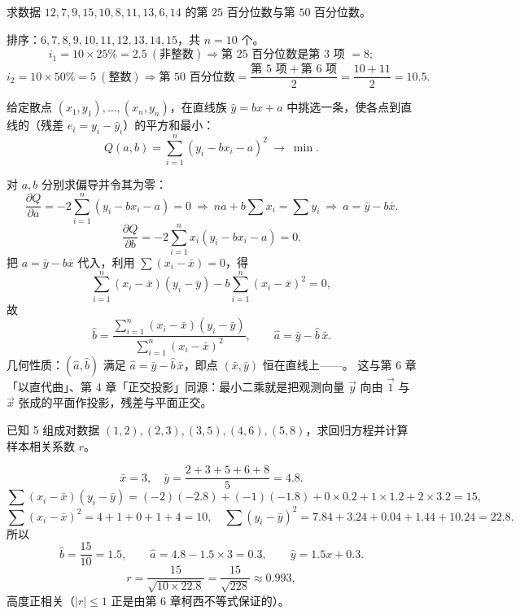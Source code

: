 \begin{explore}
\begin{example}
求数据 $12,7,9,15,10,8,11,13,6,14$ 的第 $25$ 百分位数与第 $50$ 百分位数。
\end{example}
\begin{solution}
排序：$6,7,8,9,10,11,12,13,14,15$，共 $n=10$ 个。
\[
  i_1=10\times25\%=2.5\ (\text{非整数})\Rightarrow \text{第 }25\text{ 百分位数是第 }3\text{ 项 }=8;
\]
\[
  i_2=10\times50\%=5\ (\text{整数})\Rightarrow \text{第 }50\text{ 百分位数}=\frac{\text{第 }5\text{ 项}+\text{第 }6\text{ 项}}{2}=\frac{10+11}{2}=10.5 .
\]
\end{solution}

给定散点 $(x_1,y_1),\dots,(x_n,y_n)$，在直线族 $\hat y=bx+a$ 中挑选一条，使各点到直线的（残差 $e_i=y_i-\hat y_i$）的平方和最小：
\[
  Q(a,b)=\sum_{i=1}^{n}(y_i-bx_i-a)^2\ \longrightarrow\ \min .
\]

\begin{derivation}
对 $a,b$ 分别求偏导并令其为零：
\[
  \frac{\partial Q}{\partial a}=-2\sum_{i=1}^n(y_i-bx_i-a)=0
  \ \Longrightarrow\ na+b\sum x_i=\sum y_i\ \Longrightarrow\ a=\bar y-b\bar x .
\]
\[
  \frac{\partial Q}{\partial b}=-2\sum_{i=1}^nx_i(y_i-bx_i-a)=0 .
\]
把 $a=\bar y-b\bar x$ 代入，利用 $\sum(x_i-\bar x)=0$，得
\[
  \sum_{i=1}^n(x_i-\bar x)(y_i-\bar y)-b\sum_{i=1}^n(x_i-\bar x)^2=0,
\]
故
\[
  \hat b=\frac{\sum\limits_{i=1}^n(x_i-\bar x)(y_i-\bar y)}{\sum\limits_{i=1}^n(x_i-\bar x)^2},
  \qquad \hat a=\bar y-\hat b\,\bar x .
\]
几何性质：$(\hat a,\hat b)$ 满足 $\hat a=\bar y-\hat b\,\bar x$，即点 $(\bar x,\bar y)$ 恒在直线上——。
这与第 6 章「以直代曲」、第 4 章「正交投影」同源：最小二乘就是把观测向量 $\vec y$ 向由 $\vec 1$ 与 $\vec x$ 张成的平面作投影，残差与平面正交。
\end{derivation}

\begin{example}
已知 5 组成对数据 $(1,2),(2,3),(3,5),(4,6),(5,8)$，求回归方程并计算样本相关系数 $r$。
\end{example}
\begin{solution}
\[
  \bar x=3,\quad \bar y=\frac{2+3+5+6+8}{5}=4.8 .
\]
\[
  \sum(x_i-\bar x)(y_i-\bar y)=(-2)(-2.8)+(-1)(-1.8)+0\times0.2+1\times1.2+2\times3.2=15,
\]
\[
  \sum(x_i-\bar x)^2=4+1+0+1+4=10,\quad
  \sum(y_i-\bar y)^2=7.84+3.24+0.04+1.44+10.24=22.8 .
\]
所以
\[
  \hat b=\frac{15}{10}=1.5,\qquad \hat a=4.8-1.5\times3=0.3,
  \qquad \hat y=1.5x+0.3 .
\]
\[
  r=\frac{15}{\sqrt{10\times22.8}}=\frac{15}{\sqrt{228}}\approx0.993 ,
\]
高度正相关（$|r|\le1$ 正是由第 6 章柯西不等式保证的）。
\end{solution}


\end{explore}
